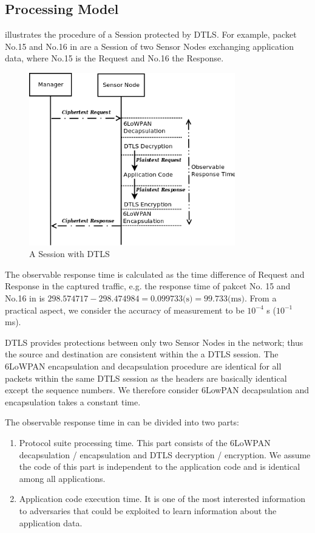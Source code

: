 \subsection{Processing Model}

 illustrates the procedure of a Session protected by DTLS. For example, packet No.15 and No.16 in  are a Session of two Sensor Nodes exchanging application data, where No.15 is the Request and No.16 the Response. 

\begin{figure}[ht!]
	\center
	\includegraphics[width=0.8\textwidth]{fig/dtls_session.png}
	\caption{A Session with DTLS}
	\label{Fig: A Session with DTLS}
\end{figure}

The observable response time is calculated as the time difference of Request and Response in the captured traffic, e.g. the response time of pakcet No. 15 and No.16 in  is $298.574717 - 298.474984 = 0.099733 \text{(s)} = 99.733 \text{(ms)}$. From a practical aspect, we consider the accuracy of measurement to be $10^{-4}$ s ($10^{-1}$ ms).

DTLS provides protections between only two Sensor Nodes in the network; thus the source and destination are consistent within the a DTLS session. The 6LoWPAN encapsulation and decapsulation procedure are identical for all packets within the same DTLS session as the headers are basically identical except the sequence numbers. We therefore consider 6LowPAN decapsulation and encapsulation takes a constant time.

The observable response time in  can be divided into two parts:
\begin{enumerate}
	\item Protocol suite processing time. This part consists of the 6LoWPAN decapsulation / encapsulation and DTLS decryption / encryption. We assume the code of this part is independent to the application code and is identical among all applications.
	\item Application code execution time. It is one of the most interested information to adversaries that could be exploited to learn information about the application data.
\end{enumerate}

